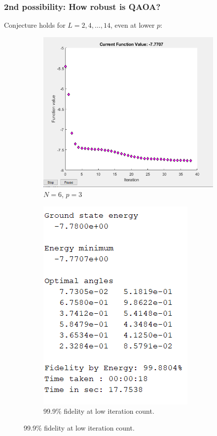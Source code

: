 \documentclass{beamer}
\theoremstyle{definition}
\begin{document}


\begin{frame}
\frametitle{2nd possibility: How robust is QAOA?}



Conjecture holds for $L = 2,4,\dots, 14$, even at lower $p$:



\begin{figure}[!htb]
	\centering
	\begin{subfigure}{0.5 \textwidth}
		\centering
		\includegraphics[scale=0.35]{N_6_p_3.PNG}
		\caption{$N=6$, $p=3$}
	\end{subfigure}%
	\begin{subfigure}{0.5 \textwidth}
		\centering
		\includegraphics[scale=0.46]{N_6_p_3_out}
		\caption{99.9\% fidelity at low iteration count.}
	\end{subfigure}
\end{figure}

\end{frame}
\end{document}
